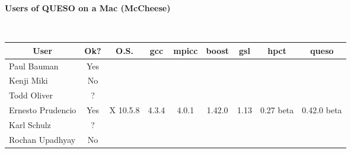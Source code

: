 \documentclass[12pt,letterpaper,twoside,onecolumn,portrait,leqno]{book}
\begin{document}
\setlength{\unitlength}{1.0in}
\setlength{\parindent}{0cm}
\setlength{\parskip}{2ex}
\thispagestyle{empty}

\centerline{\bf Users of QUESO on a Mac (McCheese)}

$~$\\

\begin{table}[!h]
\begin{center}
\begin{tabular}{|l|c|c|c|c|c|c|c|c|}
\hline
\multicolumn{1}{|c|}{User} & Ok? & O.S.     & gcc    & mpicc   & boost  & gsl   & hpct      & queso       \\
\hline
\hline
Paul Bauman                & Yes &          &        &         &        &       &           &             \\
\hline
Kenji Miki                 & No  &          &        &         &        &       &           &             \\
\hline
Todd Oliver                & ?   &          &        &         &        &       &           &             \\
\hline
Ernesto Prudencio          & Yes & X 10.5.8 & 4.3.4  & 4.0.1   & 1.42.0 & 1.13  & 0.27 beta & 0.42.0 beta \\
\hline
Karl Schulz                & ?   &          &        &         &        &       &           &             \\
\hline
Rochan Upadhyay            & No  &          &        &         &        &       &           &             \\
\hline
\end{tabular}
\end{center}
\end{table}
\end{document}
